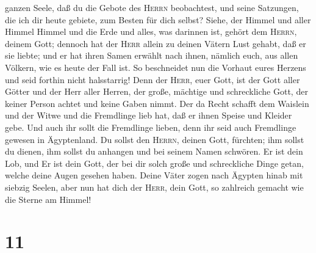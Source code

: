 ganzen Seele,  daß du die Gebote des \textsc{Herrn}
beobachtest, und seine Satzungen, die ich dir heute gebiete, zum Besten
für dich selbst?  Siehe, der Himmel und aller Himmel
Himmel und die Erde und alles, was darinnen ist, gehört dem
\textsc{Herrn}, deinem Gott;  dennoch hat der
\textsc{Herr} allein zu deinen Vätern Lust gehabt, daß er sie liebte;
und er hat ihren Samen erwählt nach ihnen, nämlich euch, aus allen
Völkern, wie es heute der Fall ist.  So beschneidet nun
die Vorhaut eures Herzens und seid forthin nicht halsstarrig!
 Denn der \textsc{Herr}, euer Gott, ist der Gott aller
Götter und der Herr aller Herren, der große, mächtige und schreckliche
Gott, der keiner Person achtet und keine Gaben nimmt. 
Der da Recht schafft dem Waislein und der Witwe und die Fremdlinge lieb
hat, daß er ihnen Speise und Kleider gebe.  Und auch ihr
sollt die Fremdlinge lieben, denn ihr seid auch Fremdlinge gewesen in
Ägyptenland.  Du sollst den \textsc{Herrn}, deinen Gott,
fürchten; ihm sollst du dienen, ihm sollst du anhangen und bei seinem
Namen schwören.  Er ist dein Lob, und Er ist dein Gott,
der bei dir solch große und schreckliche Dinge getan, welche deine Augen
gesehen haben.  Deine Väter zogen nach Ägypten hinab mit
siebzig Seelen, aber nun hat dich der \textsc{Herr}, dein Gott, so
zahlreich gemacht wie die Sterne am Himmel!

\hypertarget{section-10}{%
\section{11}\label{section-10}}

